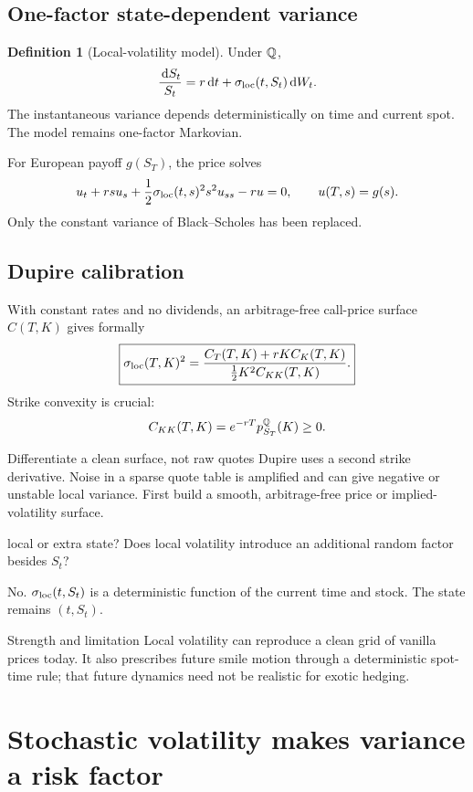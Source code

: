 \documentclass[10pt]{article}
\newcommand{\dd}{\,\mathrm d}\newcommand{\Var}{\operatorname{Var}}
\theoremstyle{definition}\newtheorem{definition}{Definition}[section]
\begin{document}
\subsection{One-factor state-dependent variance}
\begin{definition}[Local-volatility model]
Under \(\mathbb Q\),
\[
\frac{\dd S_t}{S_t}=r\dd t+
\sigma_{\rm loc}(t,S_t)\dd W_t.
\]
The instantaneous variance depends deterministically on time and current
spot. The model remains one-factor Markovian.
\end{definition}
For European payoff \(g(S_T)\), the price solves
\[
u_t+rsu_s+\frac12\sigma_{\rm loc}(t,s)^2s^2u_{ss}-ru=0,
\qquad u(T,s)=g(s).
\]
Only the constant variance of Black--Scholes has been replaced.

\subsection{Dupire calibration}
With constant rates and no dividends, an arbitrage-free call-price surface
\(C(T,K)\) gives formally
\[
\boxed{
\sigma_{\rm loc}(T,K)^2=
\frac{C_T(T,K)+rK C_K(T,K)}
{\frac12K^2C_{KK}(T,K)}.}
\]
Strike convexity is crucial:
\[
C_{KK}(T,K)=e^{-rT}p_{S_T}^{\mathbb Q}(K)\geq0.
\]
\begin{warningbox}{Differentiate a clean surface, not raw quotes}
Dupire uses a second strike derivative. Noise in a sparse quote table is
amplified and can give negative or unstable local variance. First build a
smooth, arbitrage-free price or implied-volatility surface.
\end{warningbox}
\begin{studentexercise}{local or extra state?}
Does local volatility introduce an additional random factor besides \(S_t\)?
\end{studentexercise}
\begin{shortsolution}
No. \(\sigma_{\rm loc}(t,S_t)\) is a deterministic function of the current
time and stock. The state remains \((t,S_t)\).
\end{shortsolution}
\begin{keyidea}{Strength and limitation}
Local volatility can reproduce a clean grid of vanilla prices today. It
also prescribes future smile motion through a deterministic spot-time rule;
that future dynamics need not be realistic for exotic hedging.
\end{keyidea}

\section{Stochastic volatility makes variance a risk factor}
\end{document}
